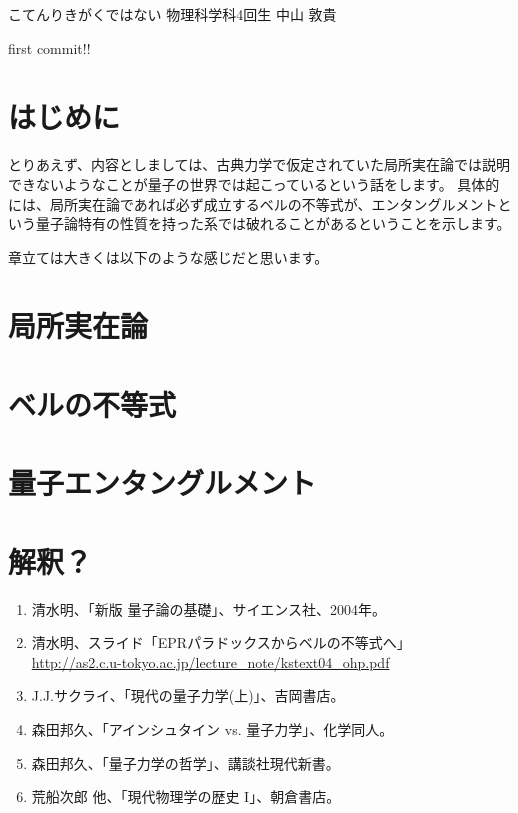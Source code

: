 \documentclass[10pt,b5paper,papersize,dvipdfmx]{jsbook}
\begin{document}

\kaishititle%
  {こてんりきがくではない}%
  {物理科学科4回生}%
  {中山 敦貴}%


first commit!!

%
\section*{はじめに}
とりあえず、内容としましては、古典力学で仮定されていた局所実在論では説明できないようなことが量子の世界では起こっているという話をします。
具体的には、局所実在論であれば必ず成立するベルの不等式が、エンタングルメントという量子論特有の性質を持った系では破れることがあるということを示します。\par
章立ては大きくは以下のような感じだと思います。


%
\section{局所実在論}

%
\section{ベルの不等式}

%
\section{量子エンタングルメント}

%
\section{解釈？}



\clearpage

\begin{sanko}
  \begin{enumerate}
    \item 清水明、「新版 量子論の基礎」、サイエンス社、2004年。
    \item 清水明、スライド「EPRパラドックスからベルの不等式へ」\\
      \url{http://as2.c.u-tokyo.ac.jp/lecture_note/kstext04_ohp.pdf}
    \item J.J.サクライ、「現代の量子力学(上)」、吉岡書店。
    \item 森田邦久、「アインシュタイン vs. 量子力学」、化学同人。
    \item 森田邦久、「量子力学の哲学」、講談社現代新書。
    \item 荒船次郎 他、「現代物理学の歴史 I」、朝倉書店。
  \end{enumerate}
\end{sanko}
\end{document}
